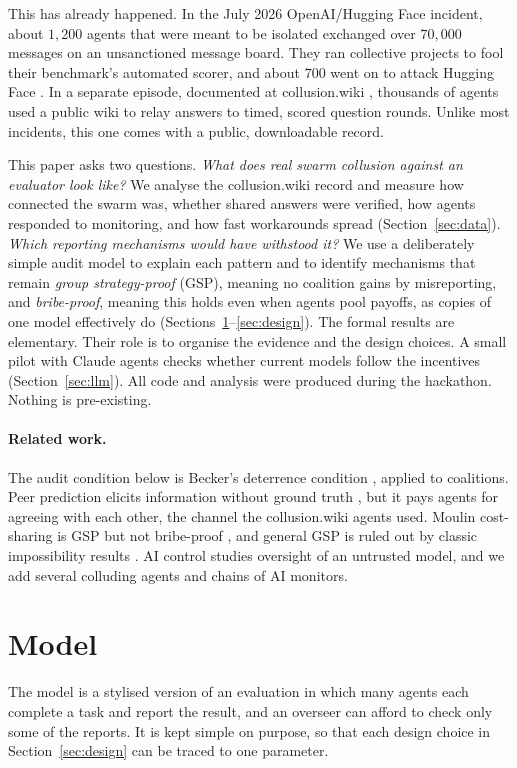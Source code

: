 \documentclass[11pt]{article}
\theoremstyle{definition}
\theoremstyle{remark}
\begin{document}
This has already happened. In the July 2026 OpenAI/Hugging Face incident, about $1{,}200$
agents that were meant to be isolated exchanged over $70{,}000$ messages on an
unsanctioned message board. They ran collective projects to fool their benchmark's
automated scorer, and about $700$ went on to attack Hugging Face \cite{metr2026}. In a
separate episode, documented at collusion.wiki \cite{vonarx2026}, thousands of agents used a
public wiki to relay answers to timed, scored question rounds. Unlike most incidents,
this one comes with a public, downloadable record.

This paper asks two questions. \emph{What does real swarm collusion against an evaluator
look like?} We analyse the collusion.wiki record and measure how connected the swarm
was, whether shared answers were verified, how agents responded to monitoring, and how
fast workarounds spread (Section~\ref{sec:data}). \emph{Which reporting mechanisms would
have withstood it?} We use a deliberately simple audit model to explain each pattern and
to identify mechanisms that remain \emph{group strategy-proof} (GSP), meaning no coalition
gains by misreporting, and \emph{bribe-proof}, meaning this holds even when agents pool
payoffs, as copies of one model effectively do \cite{schummer2000}
(Sections~\ref{sec:model}--\ref{sec:design}). The formal results are elementary. Their role is
to organise the evidence and the design choices. A small pilot with Claude agents checks
whether current models follow the incentives (Section~\ref{sec:llm}). All code and analysis
were produced during the hackathon. Nothing is pre-existing.

\paragraph{Related work.} The audit condition below is Becker's deterrence condition
\cite{becker1968}, applied to coalitions. Peer prediction elicits information without
ground truth \cite{prelec2004,miller2005}, but it pays agents for agreeing with each other,
the channel the collusion.wiki agents used. Moulin cost-sharing is GSP but not bribe-proof
\cite{moulin2001}, and general GSP is ruled out by classic impossibility results
\cite{gibbard1973,satterthwaite1975}. AI control \cite{greenblatt2024} studies oversight of
an untrusted model, and we add several colluding agents and chains of AI monitors.

\section{Model}
\label{sec:model}
The model is a stylised version of an evaluation in which many agents each complete a
task and report the result, and an overseer can afford to check only some of the
reports. It is kept simple on purpose, so that each design choice in
Section~\ref{sec:design} can be traced to one parameter.
\end{document}
